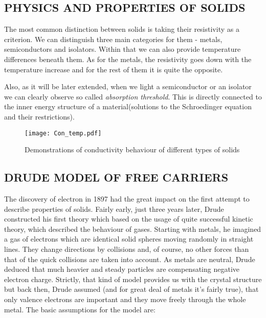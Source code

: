 
\subsection{PHYSICS AND PROPERTIES OF SOLIDS}
The most common distinction between solids is taking their resistivity as a criterion. We can distinguish three main categories for them - metals, semiconductors and isolators. Within that we can also provide temperature differences beneath them. As for the metals, the resistivity goes down with the temperature increase and for the rest of them it is quite the opposite.

Also, as it will be later extended, when we light a semiconductor or an isolator we can clearly observe so called \textit{absorption threshold}. This is directly connected to the inner energy structure of a material(solutions to the Schroedinger equation and their restrictions).

\begin{figure}[H]
\centering
\texttt{[image: Con\_temp.pdf]}
\caption{Demonstrations of conductivity behaviour of different types of solids}
\end{figure}

\subsection{DRUDE MODEL OF FREE CARRIERS}
The discovery of electron in 1897 had the great impact on the first attempt to describe properties of solids. Fairly early, just three years later, Drude constructed his first theory which based on the usage of quite successful kinetic theory, which described the behaviour of gases. Starting with metals, he imagined a gas of electrons which are identical solid spheres moving randomly in straight lines. They change directions by collisions and, of course, no other forces than that of the quick collisions are taken into account. As metals are neutral, Drude deduced that much heavier and steady particles are compensating negative electron charge. Strictly, that kind of model provides us with the crystal structure but back then, Drude assumed (and for great deal of metals it's fairly true), that only valence electrons are important and they move freely through the whole metal. The basic assumptions for the model are:

